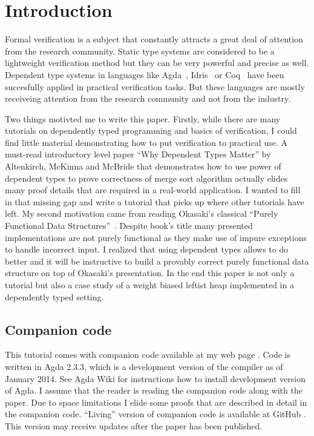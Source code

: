 \section{Introduction}

Formal verification is a subject that constantly attracts a great deal of attention from the research community. Static type systems are considered to be a lightweight verification method but they can be very powerful and precise as well. Dependent type systems in languages like Agda~\cite{Nor07}, Idris~\cite{Bra13} or Coq~\cite{coq} have been succesfully applied in practical verification tasks. But these languages are mostly receiveing attention from the research community and not from the industry.

Two things motivted me to write this paper. Firstly, while there are many tutorials on dependently typed programming and basics of verification, I could find little material demonstrating how to put verification to practical use. A must-read introductory level paper ``Why Dependent Types Matter'' by Altenkirch, McKinna and McBride \cite{AltMcBMcK05} that demonstrates how to use power of dependent types to prove correctness of merge sort algorithm actually elides many proof details that are required in a real-world application. I wanted to fill in that missing gap and write a tutorial that picks up where other tutorials have left. My second motivation came from reading Okasaki's classical ``Purely Functional Data Structures''~\cite{Oka99}. Despite book's title many presented implementations are not purely functional as they make use of impure exceptions to handle incorrect input. I realized that using dependent types allows to do better and it will be instructive to build a provably correct purely functional data structure on top of Okasaki's presentation. In the end this paper is not only a tutorial but also a case study of a weight biased leftist heap implemented in a dependently typed setting.


\subsection{Companion code}

This tutorial comes with companion code available at my web page \cite{js-webhome}. Code is written in Agda 2.3.3, which is a development version of the compiler as of January 2014. See Agda Wiki \cite{agda-wiki} for instructions how to install development version of Agda. I assume that the reader is reading the companion code along with the paper. Due to space limitations I elide some proofs that are described in detail in the companion code. ``Living'' version of companion code is available at GitHub \cite{js-github}. This version may receive updates after the paper has been published.


